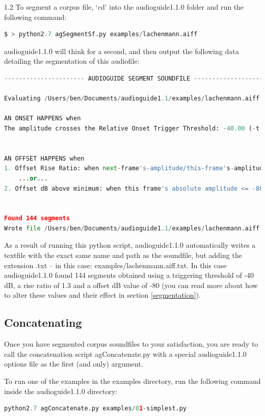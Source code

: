 \documentclass{article}
\newcommand{\ag}{audioguide1.1.0\xspace}
\begin{document}
\begin{spacing}{1.2}
To segment a corpus file, `cd' into the \ag folder and run the following command:

\begin{lstlisting}[language=python]
$ > python2.7 agSegmentSf.py examples/lachenmann.aiff
\end{lstlisting}

\ag will think for a second, and then output the following data detailing the segmentation of this audiofile:

\begin{lstlisting}[language=python]
---------------------- AUDIOGUIDE SEGMENT SOUNDFILE ----------------------

Evaluating /Users/ben/Documents/audioguide1.1/examples/lachenmann.aiff from 0.00-64.65

AN ONSET HAPPENS when
The amplitude crosses the Relative Onset Trigger Threshold: -40.00 (-t option)


AN OFFSET HAPPENS when
1. Offset Rise Ratio: when next-frame's-amplitude/this-frame's-amplitude >= 1.30 (-r option)
	...or...
2. Offset dB above minimum: when this frame's absolute amplitude <= -80.00 (minimum found amplitude of -260.00 plus the offset dB boost of 12.00 (-d option))


Found 144 segments
Wrote file /Users/ben/Documents/audioguide1.1/examples/lachenmann.aiff.txt
\end{lstlisting}

As a result of running this python script, \ag automatically writes a textfile with the exact same name and path as the soundfile, but adding the extension .txt -- in this case: examples/lachenmann.aiff.txt.  In this case \ag found 144 segments obtained using a triggering threshold of -40 dB, a rise ratio of 1.3 and a offset dB value of -80 (you can read more about how to alter these values and their effect in section \ref{segmentation}).

\subsection{Concatenating}
Once you have segmented corpus soundfiles to your satisfaction, you are ready to call the concatenation script agConcatenate.py with a special \ag options file as the first (and only) argument.  

To run one of the examples in the examples directory, run the following command inside the \ag directory:
\begin{lstlisting}[language=python]
python2.7 agConcatenate.py examples/01-simplest.py
\end{lstlisting}


\end{spacing}
\end{document}
